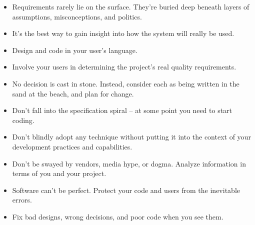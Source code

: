 %
%
\begin{itemize}
  \item {}
    Requirements rarely lie on the surface. They're buried deep beneath layers of assumptions, misconceptions, and politics.
  \item {}
    It's the best way to gain insight into how the system will really be used.
  \item {}
    Design and code in your user's language.
  \item {}
    Involve your users in determining the project's real quality requirements.
  \item {}
    No decision is cast in stone. Instead, consider each as being written in the sand at the beach, and plan for change.
  \item {}
    Don't fall into the specification spiral – at some point you need to start coding.
  \item {}
    Don't blindly adopt any technique without putting it into the context of your development practices and capabilities.
  \item {}
    Don't be swayed by vendors, media hype, or dogma. Analyze information in terms of you and your project.
  \item {}
    Software can't be perfect. Protect your code and users from the inevitable errors.
\item {}
    Fix bad designs, wrong decisions, and poor code when you see them.
%

\end{itemize}

